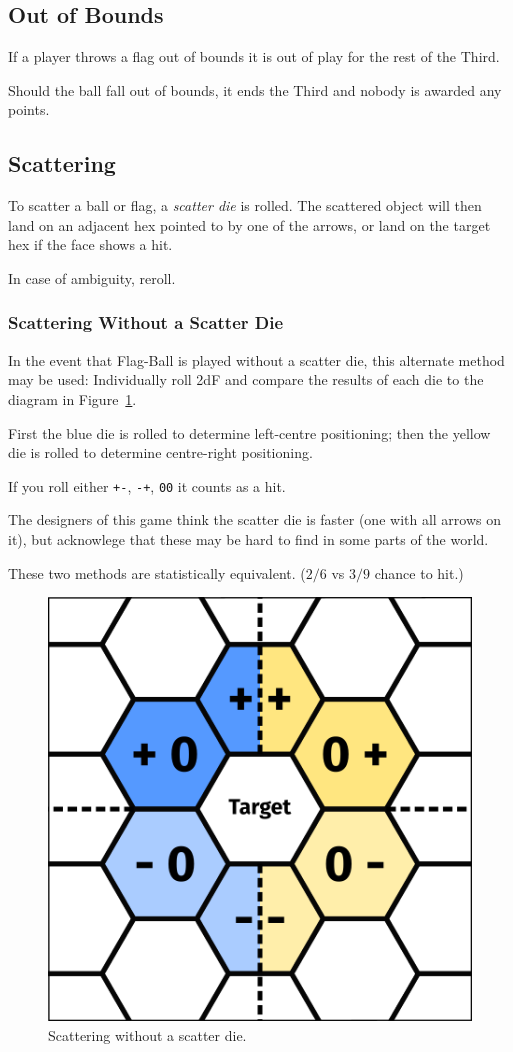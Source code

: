 \subsection{Out of Bounds}
If a player throws a flag out of bounds it is out of play for the rest of the Third.

Should the ball fall out of bounds, it ends the Third and nobody is awarded any points.

\subsection{Scattering}\label{scattering}
To scatter a ball or flag, a \textit{scatter die} is rolled.
The scattered object will then land on an adjacent hex pointed to by one of the arrows, or land on the target hex if the face shows a hit.

In case of ambiguity, reroll.

\subsubsection{Scattering Without a Scatter Die}
In the event that Flag-Ball is played without a scatter die, this alternate method may be used:
Individually roll 2dF and compare the results of each die to the diagram in Figure~\ref{fig:scatter-alternative}.

First the blue die is rolled to determine left-centre positioning; then the yellow die is rolled to determine centre-right positioning.

If you roll either \texttt{+-}, \texttt{-+}, \texttt{00} it counts as a hit.

\begin{note}
The designers of this game think the scatter die is faster (one with all arrows on it), but acknowlege that these may be hard to find in some parts of the world.

These two methods are statistically equivalent. ($2/6$ vs $3/9$ chance to hit.)
\end{note}

\begin{figure}
    \centering
    \includegraphics{graphics/scatter.png}
    \caption{Scattering without a scatter die.}
    \label{fig:scatter-alternative}
\end{figure}
